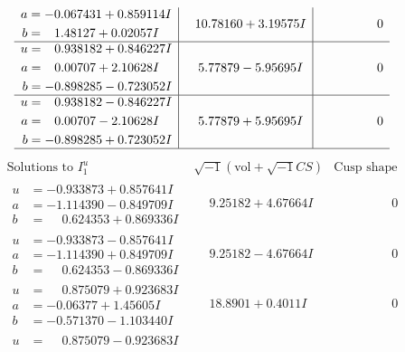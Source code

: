 \documentclass[1p]{elsarticle_modified}
\theoremstyle{definition}
\newcommand{\I}{\sqrt{-1}}
\begin{document}
$$\begin{array}{c|c|c}
\begin{aligned}
a &= -0.067431 + 0.859114 I \\
b &= \phantom{-}1.48127 + 0.02057 I\end{aligned}
 & \phantom{-}10.78160 + 3.19575 I & \phantom{-0.000000 } 0 \\ \hline\begin{aligned}
u &= \phantom{-}0.938182 + 0.846227 I \\
a &= \phantom{-}0.00707 + 2.10628 I \\
b &= -0.898285 - 0.723052 I\end{aligned}
 & \phantom{-}5.77879 - 5.95695 I & \phantom{-0.000000 } 0 \\ \hline\begin{aligned}
u &= \phantom{-}0.938182 - 0.846227 I \\
a &= \phantom{-}0.00707 - 2.10628 I \\
b &= -0.898285 + 0.723052 I\end{aligned}
 & \phantom{-}5.77879 + 5.95695 I & \phantom{-0.000000 } 0\\
 \hline 
 \end{array}$$\newpage$$\begin{array}{c|c|c}  
\text{Solutions to }I^u_{1}& \I (\text{vol} + \sqrt{-1}CS) & \text{Cusp shape}\\
 \hline 
\begin{aligned}
u &= -0.933873 + 0.857641 I \\
a &= -1.114390 - 0.849709 I \\
b &= \phantom{-}0.624353 + 0.869336 I\end{aligned}
 & \phantom{-}9.25182 + 4.67664 I & \phantom{-0.000000 } 0 \\ \hline\begin{aligned}
u &= -0.933873 - 0.857641 I \\
a &= -1.114390 + 0.849709 I \\
b &= \phantom{-}0.624353 - 0.869336 I\end{aligned}
 & \phantom{-}9.25182 - 4.67664 I & \phantom{-0.000000 } 0 \\ \hline\begin{aligned}
u &= \phantom{-}0.875079 + 0.923683 I \\
a &= -0.06377 + 1.45605 I \\
b &= -0.571370 - 1.103440 I\end{aligned}
 & \phantom{-}18.8901 + 0.4011 I & \phantom{-0.000000 } 0 \\ \hline\begin{aligned}
u &= \phantom{-}0.875079 - 0.923683 I \\

\end{aligned}
\end{array}$$
\end{document}
